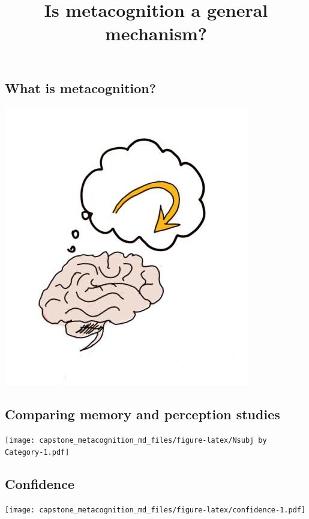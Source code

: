 \documentclass[]{article}
\title{Is metacognition a general mechanism?}
\author{}
\date{}
\begin{document}
\maketitle

\hypertarget{what-is-metacognition}{%
\subsection{What is metacognition?}\label{what-is-metacognition}}

\includegraphics{metacognition_cartoon.jpg}

\hypertarget{comparing-memory-and-perception-studies}{%
\subsection{Comparing memory and perception
studies}\label{comparing-memory-and-perception-studies}}

\texttt{[image: capstone\_metacognition\_md\_files/figure-latex/Nsubj by Category-1.pdf]}

\hypertarget{confidence}{%
\subsection{Confidence}\label{confidence}}

\texttt{[image: capstone\_metacognition\_md\_files/figure-latex/confidence-1.pdf]}
\end{document}
